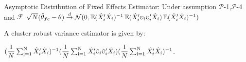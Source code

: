 \begin{theorem}
Asymptotic Distribution of Fixed Effects Estimator: Under assumption $\mathcal{P}$-1,$\mathcal{P}$-4  and $\mathcal{F}$ $\sqrt{N}(\hat{\theta}_{fe} - \theta) \overset{d}{\to} \mathcal{N}(0,\operatorname{\mathbb{E}}(\dot{X}_i'\dot{X}_i)^{-1}\operatorname{\mathbb{E}}(\dot{X}_i'\upsilon_i \upsilon_i'\dot{X}_i)\operatorname{\mathbb{E}}(\dot{X}_i'\dot{X}_i)^{-1})$
\end{theorem}
A cluster robust variance estimator is given by:

$(\dfrac{1}{N} \operatorname*{\sum_{i=1}^N} \dot{X}_i'\dot{X}_i)^{-1} (\dfrac{1}{N} \operatorname*{\sum_{i=1}^N} \dot{X}_i'\hat\upsilon_i \hat\upsilon_i'\dot{X}_i) (\dfrac{1}{N}\operatorname*{\sum_{i=1}^N} \dot{X}_i'\dot{X}_i)^{-1}$.



